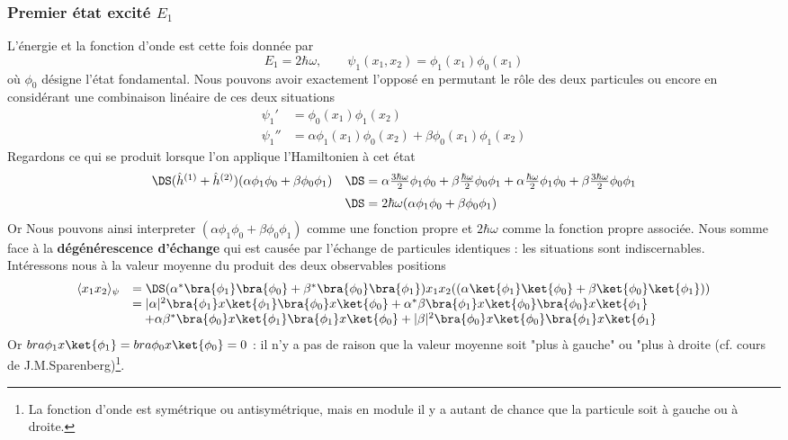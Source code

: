 \subsubsection{Premier état excité $E_1$}
L'énergie et la fonction d'onde est cette fois donnée par
\begin{equation}
E_1 = 2\hbar \omega,\qquad \psi_1(x_1,x_2) = \phi_1(x_1)\phi_0(x_1)
\end{equation}
où $\phi_0$ désigne l'état fondamental. Nous pouvons avoir exactement l'opposé en permutant le rôle des deux 
particules ou encore en considérant une combinaison linéaire de ces deux situations
\begin{equation}
\begin{array}{ll}
\psi_1' &= \phi_0(x_1)\phi_1(x_2)\\
\psi_1'' &=\alpha \phi_1(x_1)\phi_0(x_2)+\beta \phi_0(x_1)\phi_1(x_2)
\end{array}
\end{equation}
Regardons ce qui se produit lorsque l'on applique l'Hamiltonien à cet état
\begin{equation}
\begin{array}{ll}
\DS(\hat{h}^{(1)}+\hat{h}^{(2)})(\alpha\phi_1\phi_0+\beta\phi_0\phi_1) &\DS= \alpha\frac{3\hbar \omega}{2}\phi_1\phi_0 + \beta
\frac{\hbar\omega}{2}\phi_0\phi_1 + \alpha\frac{\hbar\omega}{2}\phi_1\phi_0+\beta\frac{3\hbar\omega}{2}\phi_0\phi_1\vspace{2mm}\\ 
&\DS= 
2\hbar\omega(\alpha\phi_1\phi_0+\beta\phi_0\phi_1)
\end{array}
\end{equation}
Or
Nous pouvons ainsi interpreter $(\alpha\phi_1\phi_0+\beta\phi_0\phi_1)$ comme une fonction propre et $2\hbar\omega$ comme 
la fonction propre associée. Nous somme face à la \textbf{dégénérescence d'échange} qui est causée par l'échange de particules 
identiques : les situations sont indiscernables.\\

Intéressons nous à la valeur moyenne du produit des deux observables positions
\begin{equation}
\begin{array}{ll}
\langle x_1x_2\rangle_\psi &=\DS (\alpha^*\bra{\phi_1}\bra{\phi_0}+\beta^*\bra{\phi_0}\bra{\phi_1})x_1x_2
((\alpha\ket{\phi_1}\ket{\phi_0}+\beta\ket{\phi_0}\ket{\phi_1}))\\
&=|\alpha|^2\bra{\phi_1}x\ket{\phi_1}\bra{\phi_0}x\ket{\phi_0} + \alpha^*\beta \bra{\phi_1}x\ket{\phi_0}\bra{\phi_0}x\ket{\phi_1} \\&\ \ \ + \alpha\beta^*\bra{\phi_0}x\ket{\phi_1}\bra{\phi_1}x\ket{\phi_0} + |\beta|^2\bra{\phi_0}x\ket{\phi_0}\bra{\phi_1}x\ket{\phi_1}
\end{array}
\end{equation}
Or $bra{\phi_1}x\ket{\phi_1} = bra{\phi_0}x\ket{\phi_0} = 0$ : il n'y a pas de raison que la valeur moyenne soit "plus à gauche" 
ou "plus à droite (cf. cours de J.M.Sparenberg)\footnote{La fonction d'onde est symétrique ou antisymétrique, mais en module il y a autant de chance que la particule soit à gauche ou à droite.}.\\

